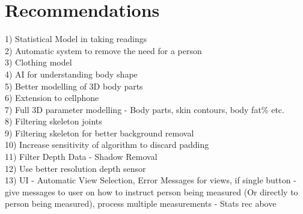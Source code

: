 \chapter{Recommendations} \label{recommendations}

1) Statistical Model in taking readings\\
2) Automatic system to remove the need for a person\\
3) Clothing model\\
4) AI for understanding body shape\\
5) Better modelling of 3D body parts\\
6) Extension to cellphone\\
7) Full 3D parameter modelling - Body parts, skin contours, body fat\% etc.\\
8) Filtering skeleton joints\\
9) Filtering skeleton for better background removal\\
10) Increase sensitivity of algorithm to discard padding\\
11) Filter Depth Data - Shadow Removal\\
12) Use better resolution depth sensor\\
13) UI - Automatic View Selection, Error Messages for views, if single button - give messages to user on how to instruct person being measured (Or directly to person being measured), process multiple measurements - Stats rec above\\ 
